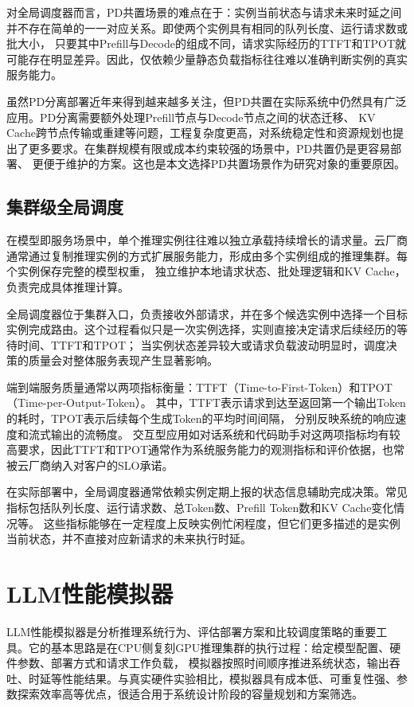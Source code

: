 对全局调度器而言，PD共置场景的难点在于：实例当前状态与请求未来时延之间并不存在简单的一一对应关系。即使两个实例具有相同的队列长度、运行请求数或批大小，
只要其中Prefill与Decode的组成不同，请求实际经历的TTFT和TPOT就可能存在明显差异。因此，仅依赖少量静态负载指标往往难以准确判断实例的真实服务能力。

虽然PD分离部署近年来得到越来越多关注，但PD共置在实际系统中仍然具有广泛应用。PD分离需要额外处理Prefill节点与Decode节点之间的状态迁移、
KV Cache跨节点传输或重建等问题，工程复杂度更高，对系统稳定性和资源规划也提出了更多要求。在集群规模有限或成本约束较强的场景中，PD共置仍是更容易部署、
更便于维护的方案。这也是本文选择PD共置场景作为研究对象的重要原因。

\subsection{集群级全局调度}

在模型即服务场景中，单个推理实例往往难以独立承载持续增长的请求量。云厂商通常通过复制推理实例的方式扩展服务能力，形成由多个实例组成的推理集群。每个实例保存完整的模型权重，
独立维护本地请求状态、批处理逻辑和KV Cache，负责完成具体推理计算。

全局调度器位于集群入口，负责接收外部请求，并在多个候选实例中选择一个目标实例完成路由。这个过程看似只是一次实例选择，实则直接决定请求后续经历的等待时间、TTFT和TPOT；
当实例状态差异较大或请求负载波动明显时，调度决策的质量会对整体服务表现产生显著影响。

端到端服务质量通常以两项指标衡量：TTFT（Time-to-First-Token）和TPOT（Time-per-Output-Token）。
其中，TTFT表示请求到达至返回第一个输出Token的耗时，TPOT表示后续每个生成Token的平均时间间隔，
分别反映系统的响应速度和流式输出的流畅度。
交互型应用如对话系统和代码助手对这两项指标均有较高要求，因此TTFT和TPOT通常作为系统服务能力的观测指标和评价依据，也常被云厂商纳入对客户的SLO承诺。

在实际部署中，全局调度器通常依赖实例定期上报的状态信息辅助完成决策。常见指标包括队列长度、运行请求数、总Token数、Prefill Token数和KV Cache变化情况等。
这些指标能够在一定程度上反映实例忙闲程度，但它们更多描述的是实例当前状态，并不直接对应新请求的未来执行时延。

\section{LLM性能模拟器}

LLM性能模拟器是分析推理系统行为、评估部署方案和比较调度策略的重要工具。它的基本思路是在CPU侧复刻GPU推理集群的执行过程：给定模型配置、硬件参数、部署方式和请求工作负载，
模拟器按照时间顺序推进系统状态，输出吞吐、时延等性能结果。与真实硬件实验相比，模拟器具有成本低、可重复性强、参数探索效率高等优点，很适合用于系统设计阶段的容量规划和方案筛选。

